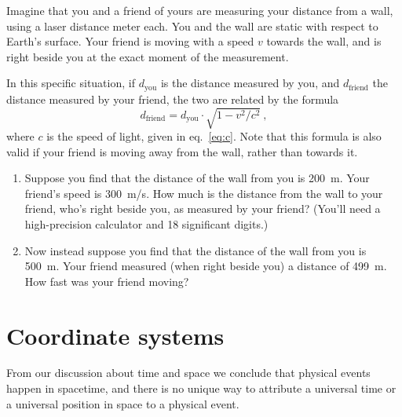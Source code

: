 \documentclass[a4paper,12pt,%
onecolumn,oneside,%
british%
]{memoir}
\renewcommand*{\|}[1][]{\nonscript\:#1\vert\nonscript\:\mathopen{}}
\newcommand*{\eqn}{eq.}%
\newcommand*{\yc}{c} %
\begin{document}
\begin{exercise}[label={ex:distance}]
  Imagine that you and a friend of yours are measuring your distance from a wall, using a laser distance meter each. You and the wall are static with respect to Earth's surface. Your friend is moving with a speed $v$ towards the wall, and is right beside you at the exact moment of the measurement.

  \smallskip

  In this specific situation, if $d_{\textrm{you}}$ is the distance measured by you, and $d_{\textrm{friend}}$ the distance measured by your friend, the two are related by the formula
  \begin{equation*}
    d_{\textrm{friend}} = d_{\textrm{you}} \cdot \sqrt{1 - v^{2}/\yc^{2}} \ ,
  \end{equation*}
  where $\yc$ is the speed of light, given in \eqn~\eqref{eq:c}. Note that this formula is also valid if your friend is moving away from the wall, rather than towards it.

\begin{enumerate}[exerc]
\item\label{item:distance_friend} Suppose you find that the distance of the wall from you is \qty{200}{m}. Your friend's speed is \qty{300}{m/s}. How much is the distance from the wall to your friend, who's right beside you, as measured by your friend? (You'll need a high-precision calculator and 18 significant digits.)

\item\label{item:velocity_friend} Now instead suppose you find that the distance of the wall from you is \qty{500}{m}. Your friend measured (when right beside you) a distance of \qty{499}{m}. How fast was your friend moving?
\end{enumerate}
\end{exercise}

\section{Coordinate systems}
\label{sec:coords}

%
From our discussion about time and space we conclude that physical events happen in spacetime, and there is no unique way to attribute a universal time or a universal position in space to a physical event.
\end{document}
